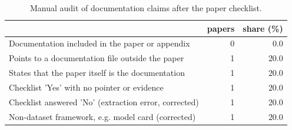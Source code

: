 \begin{table}
\caption{Manual audit of documentation claims after the paper checklist.}
\label{tab:docaudit}
\begin{tabular}{lrr}
\toprule
 & papers & share (\%) \\
\midrule
Documentation included in the paper or appendix & 0 & 0.0 \\
Points to a documentation file outside the paper & 1 & 20.0 \\
States that the paper itself is the documentation & 1 & 20.0 \\
Checklist 'Yes' with no pointer or evidence & 1 & 20.0 \\
Checklist answered 'No' (extraction error, corrected) & 1 & 20.0 \\
Non-dataset framework, e.g. model card (corrected) & 1 & 20.0 \\
\bottomrule
\end{tabular}
\end{table}
